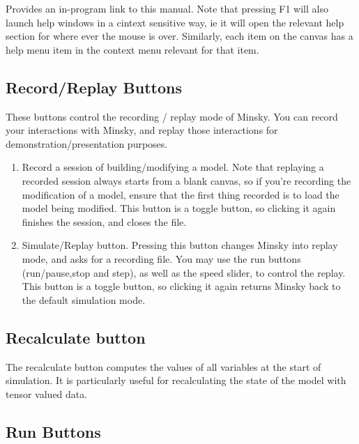 Provides an in-program link to this manual. Note that pressing F1
will also launch help windows in a cintext sensitive way, ie it will
open the relevant help section for where ever the mouse is over. Similarly,
each item on the canvas has a help menu item in the context menu relevant
for that item.

\subsection{Record/Replay Buttons}

\label{RecReplayButtons}


These buttons control the recording / replay mode of Minsky. You can
record your interactions with Minsky, and replay those interactions
for demonstration/presentation purposes.
\begin{enumerate}
\item Record a session of building/modifying a model. Note that replaying
a recorded session always starts from a blank canvas, so if you're
recording the modification of a model, ensure that the first thing
recorded is to load the model being modified. This button is a toggle
button, so clicking it again finishes the session, and closes the
file. 
\item Simulate/Replay button. Pressing this button changes Minsky into replay
mode, and asks for a recording file. You may use the run buttons (run/pause,stop
and step), as well as the speed slider, to control the replay. This
button is a toggle button, so clicking it again returns Minsky back
to the default simulation mode. 
\end{enumerate}

\subsection{Recalculate button}

\label{Recalculate}


The recalculate button computes the values of all variables at the
start of simulation. It is particularly useful for recalculating the
state of the model with tensor valued data.

\subsection{Run Buttons}

